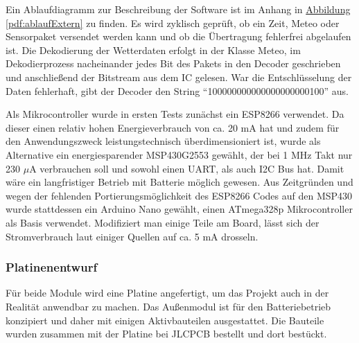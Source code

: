 \documentclass[a4paper,11pt]{article}
\newcounter{subsubsubsection}[subsubsection]
\begin{document}
\vspace{0.2cm}
\noindent
Ein Ablaufdiagramm zur Beschreibung der Software ist im Anhang in \hyperref[pdf:ablaufExtern]{Abbildung \ref{pdf:ablaufExtern}} zu finden. Es wird zyklisch geprüft, ob ein Zeit, Meteo oder Sensorpaket
versendet werden kann und ob die Übertragung fehlerfrei abgelaufen ist. Die Dekodierung der Wetterdaten erfolgt in der Klasse Meteo, im Dekodierprozess nacheinander
jedes Bit des Pakets in den Decoder geschrieben und anschließend der Bitstream aus dem IC gelesen. War die Entschlüsselung der Daten fehlerhaft, gibt der Decoder den String
``100000000000000000000100'' aus. 

\vspace{0.2cm}
\noindent
Als Mikrocontroller wurde in ersten Tests zunächst ein ESP8266 verwendet. Da dieser einen relativ hohen Energieverbrauch von ca. 20 mA hat und zudem für
den Anwendungszweck leistungstechnisch überdimensioniert ist, wurde als Alternative ein energiesparender MSP430G2553 gewählt, der bei 1 MHz Takt nur
230 $\mu$A verbrauchen soll und sowohl einen UART, als auch I2C Bus hat. Damit wäre ein langfristiger Betrieb mit Batterie möglich gewesen. 
Aus Zeitgründen und wegen der fehlenden Portierungsmöglichkeit des ESP8266 Codes auf den MSP430 wurde stattdessen ein Arduino Nano gewählt, einen ATmega328p
Mikrocontroller als Basis verwendet. Modifiziert man einige Teile am Board, lässt sich der Stromverbrauch laut einiger Quellen auf ca. 5 mA drosseln. 

\subsubsection{Platinenentwurf}
\label{subsubsub:platinenentwurfExtern}

Für beide Module wird eine Platine angefertigt, um das Projekt auch in der Realität anwendbar zu machen. Das Außenmodul ist für den Batteriebetrieb konzipiert
und daher mit einigen Aktivbauteilen ausgestattet. Die Bauteile wurden zusammen mit der Platine bei JLCPCB bestellt und dort bestückt. 

\label{subsubsubsub:schaltplanExtern}
\end{document}
